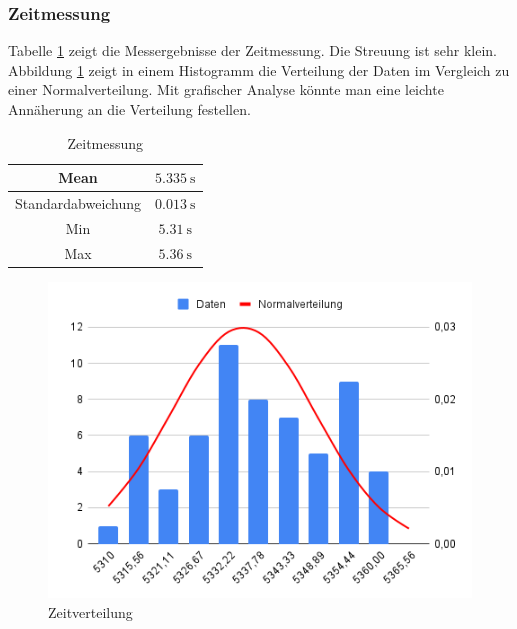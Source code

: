 \documentclass[ngerman]{tudscrreprt}
\begin{document}
\subsubsection{Zeitmessung}
Tabelle \ref{table:zeitmessung} zeigt die Messergebnisse der Zeitmessung. Die Streuung ist
sehr klein.
Abbildung \ref{figure:zeitverteilung} zeigt in einem Histogramm die Verteilung der
Daten im Vergleich zu einer Normalverteilung. Mit grafischer Analyse könnte man eine
leichte Annäherung an die Verteilung festellen.
%
\begin{table}[H]
    \centering
    \begin{tabular}{|c|c|}
    \hline
    Mean               & $\SI{5,335}{\s}$ \\ \hline
    Standardabweichung & $\SI{0,013}{\s}$ \\ \hline
    Min                & $\SI{5,31}{\s}$ \\ \hline
    Max                & $\SI{5,36}{\s}$ \\ \hline
    \end{tabular}
    \caption{Zeitmessung}
    \label{table:zeitmessung}
\end{table}
%
\begin{figure}[H]
    \centering
    \includegraphics[scale=0.5]{src/charts/zeitverteilung.png}
    \caption{Zeitverteilung}
    \label{figure:zeitverteilung}
\end{figure}
%
\end{document}
